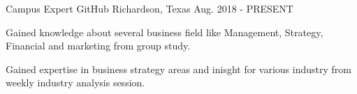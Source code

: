 \begin{cventries}
  \cventry
    {Campus Expert} %
    {GitHub} %
    {Richardson, Texas} %
    {Aug. 2018 - PRESENT} %
    {
      \begin{cvitems} %
        \item {Gained knowledge about several business field like Management, Strategy, Financial and marketing from group study.}
        \item {Gained expertise in business strategy areas and inisght for various industry from weekly industry analysis session.}
      \end{cvitems}
    }

\end{cventries}
